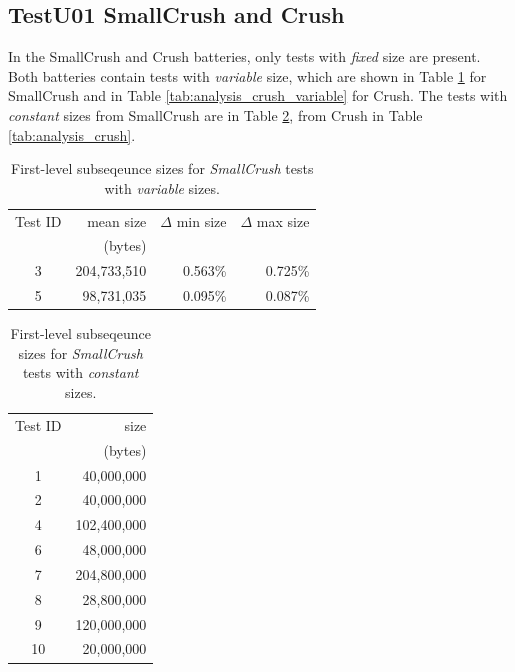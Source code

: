 \documentclass[
  digital,     %
  oneside,     %
  nosansbold,  %
  nocolorbold, %
  nolof,         %
  nolot,         %
]{fithesis4}
\begin{document}
\subsection{TestU01 SmallCrush and Crush}
In the SmallCrush and Crush batteries, only tests with \emph{fixed} size are present. Both batteries contain tests with \emph{variable} size, which are shown in Table \ref{tab:analysis_smallcrush_variable} for SmallCrush and in Table \ref{tab:analysis_crush_variable} for Crush. The tests with \emph{constant} sizes from SmallCrush are in Table \ref{tab:analysis_smallcrush}, from Crush in  Table \ref{tab:analysis_crush}.


\begin{table}[H]
  \begin{tabularx}{0.75\textwidth}{c|r|r|r}
   Test ID & mean size & $\Delta$ min size & $\Delta$ max size\\
     & (bytes) & & \\
     \midrule
    3 & 204,733,510 & 0.563\% & 0.725\% \\
    5 & 98,731,035 & 0.095\% & 0.087\% \\
  \end{tabularx}
  \caption{First-level subseqeunce sizes for \emph{SmallCrush} tests with \emph{variable} sizes.}
  \label{tab:analysis_smallcrush_variable}
\end{table}

\begin{table}[H]
  \begin{tabularx}{0.36\textwidth}{c|r}
  Test ID & size \\
    & (bytes) \\
  \midrule
    1 & 40,000,000 \\
    2 & 40,000,000 \\
    4 & 102,400,000 \\
    6 & 48,000,000 \\
    7 & 204,800,000 \\
    8 & 28,800,000 \\
    9 & 120,000,000 \\
    10 & 20,000,000 \\

  \end{tabularx}
  \caption{First-level subseqeunce sizes for \emph{SmallCrush} tests with \emph{constant} sizes.}
  \label{tab:analysis_smallcrush}
\end{table}
\end{document}
